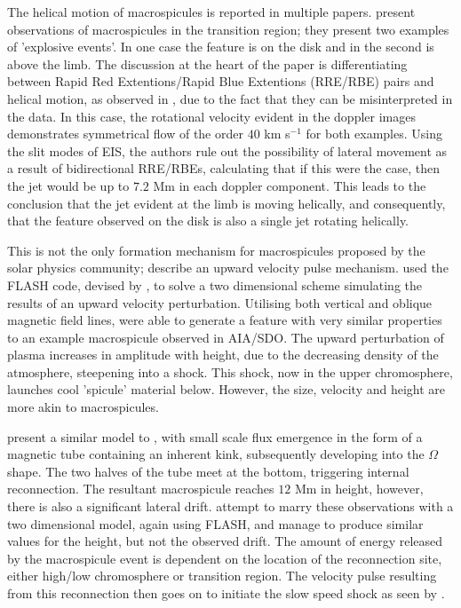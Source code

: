 The helical motion of macrospicules is reported in multiple papers.
\cite{Curdt2011} present observations of macrospicules in the transition region; they present two examples of 'explosive events'.
In one case the feature is on the disk and in the second is above the limb.
The discussion at the heart of the paper is differentiating between Rapid Red Extentions/Rapid Blue Extentions (RRE/RBE) pairs and helical motion, as observed in \cite{Kurdize2015}, due to the fact that they can be misinterpreted in the data.
In this case, the rotational velocity evident in the doppler images demonstrates symmetrical flow of the order $40$ km s${^{-1}}$ for both examples.
Using the slit modes of EIS, the authors rule out the possibility of lateral movement as a result of bidirectional RRE/RBEs, calculating that if this were the case, then the jet would be up to $7.2$ Mm in each doppler component.
This leads to the conclusion that the jet evident at the limb is moving helically, and consequently, that the feature observed on the disk is also a single jet rotating helically.

This is not the only formation mechanism for macrospicules proposed by the solar physics community; \cite{Murawski2011} describe an upward velocity pulse mechanism.
\cite{Murawski2011} used the FLASH code, devised by \cite{Lee2009}, to solve a two dimensional scheme simulating the results of an upward velocity perturbation.
Utilising both vertical and oblique magnetic field lines, \cite{Murawski2011} were able to generate a feature with very similar properties to an example macrospicule observed in AIA/SDO.
The upward perturbation of plasma increases in amplitude with height, due to the decreasing density of the atmosphere, steepening into a shock.
This shock, now in the upper chromosphere, launches cool 'spicule' material below.
However, the size, velocity and height are more akin to macrospicules.

\cite{Kayshap2013} present a similar model to \cite{Archontis2005}, with small scale flux emergence in the form of a magnetic tube containing an inherent kink, subsequently developing into the $\Omega$ shape.
The two halves of the tube meet at the bottom, triggering internal reconnection.
The resultant macrospicule reaches $12$ Mm in height, however, there is also a significant lateral drift.
\cite{Kayshap2013} attempt to marry these observations with a two dimensional model, again using FLASH, and manage to produce similar values for the height, but not the observed drift.
The amount of energy released by the macrospicule event is dependent on the location of the reconnection site, either high/low chromosphere or transition region.
The velocity pulse resulting from this reconnection then goes on to initiate the slow speed shock as seen by \cite{Murawski2011}.







